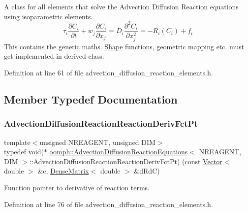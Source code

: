 A class for all elements that solve the Advection Diffusion Reaction equations using isoparametric elements. \[ \tau_{i} \frac{\partial C_{i}}{\partial t} + w_{j} \frac{\partial C_{i}}{\partial x_{j}} = D_{i}\frac{\partial^2 C_{i}}{\partial x_j^2} = - R_{i}(C_{i}) + f_{i} \] This contains the generic maths. \hyperlink{classoomph_1_1Shape}{Shape} functions, geometric mapping etc. must get implemented in derived class. 

Definition at line 61 of file advection\+\_\+diffusion\+\_\+reaction\+\_\+elements.\+h.



\subsection{Member Typedef Documentation}
\mbox{\label{classoomph_1_1AdvectionDiffusionReactionEquations_af7afb472439d8e83b825c0a3c03190a7}} 
\subsubsection{\texorpdfstring{Advection\+Diffusion\+Reaction\+Reaction\+Deriv\+Fct\+Pt}{AdvectionDiffusionReactionReactionDerivFctPt}}
{\footnotesize\ttfamily template$<$unsigned N\+R\+E\+A\+G\+E\+NT, unsigned D\+IM$>$ \\
typedef void($\ast$ \hyperlink{classoomph_1_1AdvectionDiffusionReactionEquations}{oomph\+::\+Advection\+Diffusion\+Reaction\+Equations}$<$ N\+R\+E\+A\+G\+E\+NT, D\+IM $>$\+::Advection\+Diffusion\+Reaction\+Reaction\+Deriv\+Fct\+Pt) (const \hyperlink{classoomph_1_1Vector}{Vector}$<$ double $>$ \&c, \hyperlink{classoomph_1_1DenseMatrix}{Dense\+Matrix}$<$ double $>$ \&d\+RdC)}



Function pointer to derivative of reaction terms. 



Definition at line 76 of file advection\+\_\+diffusion\+\_\+reaction\+\_\+elements.\+h.

